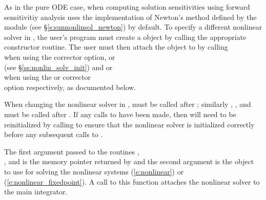 As in the pure ODE case, when computing solution sensitivities using forward
sensitivitiy analysis {\cvodes} uses the {\sunnonlinsol} implementation of
Newton's method defined by the {\sunnonlinsolnewton} module (see
\S\ref{s:sunnonlinsol_newton}) by default. To specify a different nonlinear solver in
{\cvodes}, the user's program must create a {\sunnonlinsol} object by calling
the appropriate constructor routine.  The user must then attach the
{\sunnonlinsol} object to {\cvodes} by calling \\ \noindent
{} when using the 
corrector option, or \\ \noindent
{} (see
\S\ref{ss:nonlin_solv_init}) and  or \\ \noindent
{} when using the  or
 corrector \\ \noindent
option respectively, as documented below.

When changing the nonlinear solver in {\cvodes},  must
be called after ; similarly ,
, and  must be
called after . If any calls to  have been made,
then {\cvodes} will need to be reinitialized by calling  to
ensure that the nonlinear solver is initialized correctly before any subsequent
calls to .

The first argument passed to the routines
, \\ \noindent
{}, and
 is the {\cvodes} memory pointer returned by
 and the second argument is the {\sunnonlinsol} object to use for
solving the nonlinear systems (\ref{e:nonlinear}) or
(\ref{e:nonlinear_fixedpoint}). A call to this function attaches
the nonlinear solver to the main {\cvodes} integrator.

